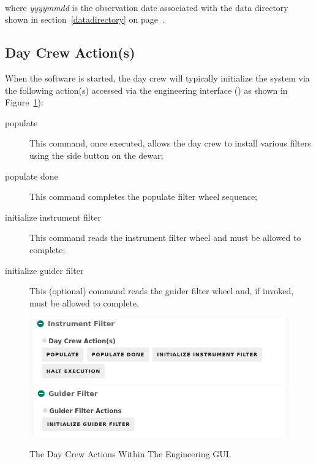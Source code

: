 \documentclass[12pt,twoside]{article}
\begin{document}



 \\

\noindent where \emph{yyyymmdd} is the observation date associated with the data directory shown in section~\ref{datadirectory} on page~\pageref{datadirectory}.

\subsection{Day Crew Action(s)}
\label{daycrewactions}

\noindent When the software is started, the day crew will typically initialize the system via the following action(s)
accessed via the engineering interface () as shown in Figure~\ref{engineer}):

\begin{description}
 \item[{\sc populate}] This command, once executed, allows the day crew to install various filters using the side 
                       button on the dewar;
 \item[{\sc populate done}] This command completes the populate filter wheel sequence;
 \item[{\sc initialize instrument filter}] This command reads the instrument filter wheel and must be allowed to complete;
 \item[{\sc initialize guider filter}] This (optional) command reads the guider filter wheel and, if invoked, must be allowed 
                                       to complete.
\end{description}

\begin{figure}[!h]
 \centering
 \includegraphics[width=0.5\linewidth]{DayCrewActions1.png}
 \includegraphics[width=0.5\linewidth]{DayCrewActions2.png}
 \caption{The Day Crew Actions Within The Engineering GUI.}
 \label{engineer}
\end{figure}
\end{document}
